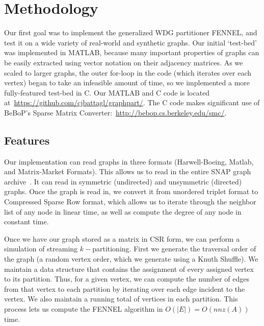 \section{Methodology}
Our first goal was to implement the generalized WDG partitioner FENNEL, and test it on a wide variety of real-world and synthetic graphs. 
Our initial `test-bed' was implemented in MATLAB, because many important properties of graphs can be easily extracted using vector notation on their adjacency matrices. 
As we scaled to larger graphs, the outer for-loop in the code (which iterates over each vertex) began to take an infeasible amount of time, so we implemented a more fully-featured test-bed in C. Our MATLAB and C code is located at~\url{https://github.com/cjbattagl/graphpart/}. 
The C code makes significant use of BeBoP's Sparse Matrix Converter:~\url{http://bebop.cs.berkeley.edu/smc/}.

\subsection{Features}
Our implementation can read graphs in three formats (Harwell-Boeing, Matlab, and Matrix-Market Formats). 
This allows us to read in the entire SNAP graph archive~\cite{Leskovec-data}. 
It can read in symmetric (undirected) and unsymmetric (directed) graphs. 
Once the graph is read in, we convert it from unordered triplet format to Compressed Sparse Row format, which allows us to iterate through the neighbor list of any node in linear time, as well as compute the degree of any node in constant time.

Once we have our graph stored as a matrix in CSR form, we can perform a simulation of streaming $k-$partitioning. 
First we generate the traversal order of the graph (a random vertex order, which we generate using a Knuth Shuffle). 
We maintain a data structure that contains the assignment of every assigned vertex to its partition. 
Thus, for a given vertex, we can compute the number of edges from that vertex to each partition by iterating over each edge incident to the vertex. 
We also maintain a running total of vertices in each partition. 
This process lets us compute the FENNEL algorithm in $O(|E|)=O(nnz(A))$ time. 